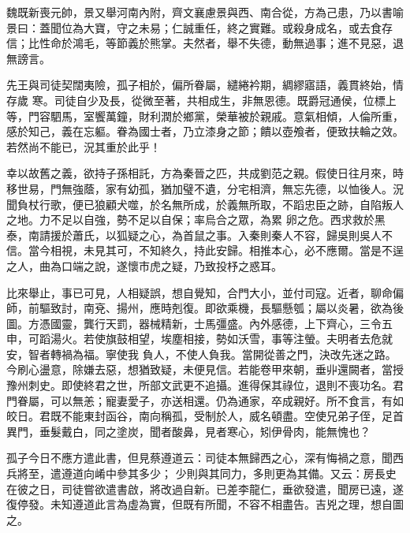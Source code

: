 \begin{pinyinscope}
 魏既新喪元帥，景又舉河南內附，齊文襄慮景與西、南合從，方為己患，乃以書喻景曰：蓋聞位為大寶，守之未易；仁誠重任，終之實難。或殺身成名，或去食存信；比性命於鴻毛，等節義於熊掌。夫然者，舉不失德，動無過事；進不見惡，退無謗言。



 先王與司徒契闊夷險，孤子相於，偏所眷屬，繾綣衿期，綢繆寤語，義貫終始，情存歲
 寒。司徒自少及長，從微至著，共相成生，非無恩德。既爵冠通侯，位標上等，門容駟馬，室饗萬鐘，財利潤於鄉黨，榮華被於親戚。意氣相傾，人倫所重，感於知己，義在忘軀。眷為國士者，乃立漆身之節；饋以壺飧者，便致扶輪之效。若然尚不能已，況其重於此乎！



 幸以故舊之義，欲持子孫相託，方為秦晉之匹，共成劉范之親。假使日往月來，時移世易，門無強蔭，家有幼孤，猶加璧不遺，分宅相濟，無忘先德，以恤後人。況聞負杖行歌，便已狼顧犬噬，於名無所成，於義無所取，不蹈忠臣之跡，自陷叛人之地。力不足以自強，勢不足以自保；率烏合之眾，為累
 卵之危。西求救於黑泰，南請援於蕭氏，以狐疑之心，為首鼠之事。入秦則秦人不容，歸吳則吳人不信。當今相視，未見其可，不知終久，持此安歸。相推本心，必不應爾。當是不逞之人，曲為口端之說，遂懷市虎之疑，乃致投杼之惑耳。



 比來舉止，事已可見，人相疑誤，想自覺知，合門大小，並付司寇。近者，聊命偏師，前驅致討，南兗、揚州，應時剋復。即欲乘機，長驅懸瓠；屬以炎暑，欲為後圖。方憑國靈，龔行天罰，器械精新，士馬彊盛。內外感德，上下齊心，三令五申，可蹈湯火。若使旗鼓相望，埃塵相接，勢如沃雪，事等注螢。夫明者去危就安，智者轉禍為福。寧使我
 負人，不使人負我。當開從善之門，決改先迷之路。今刷心盪意，除嫌去惡，想猶致疑，未便見信。若能卷甲來朝，垂丱還闕者，當授豫州刺史。即使終君之世，所部文武更不追攝。進得保其祿位，退則不喪功名。君門眷屬，可以無恙；寵妻愛子，亦送相還。仍為通家，卒成親好。所不食言，有如皎日。君既不能東封函谷，南向稱孤，受制於人，威名頓盡。空使兄弟子侄，足首異門，垂髮戴白，同之塗炭，聞者酸鼻，見者寒心，矧伊骨肉，能無愧也？



 孤子今日不應方遣此書，但見蔡遵道云：司徒本無歸西之心，深有悔禍之意，聞西兵將至，遣遵道向崤中參其多少；
 少則與其同力，多則更為其備。又云：房長史在彼之日，司徒嘗欲遣書啟，將改過自新。已差李龍仁，垂欲發遣，聞房已遠，遂復停發。未知遵道此言為虛為實，但既有所聞，不容不相盡告。吉兇之理，想自圖之。




\end{pinyinscope}
